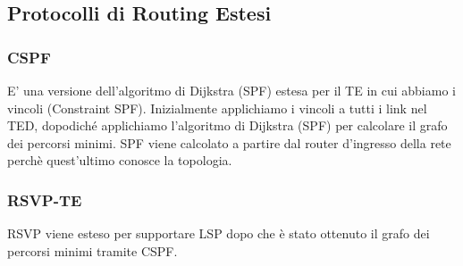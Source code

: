 \documentclass{article}
\begin{document}
\newpage
\subsection{Protocolli di Routing Estesi}
\subsubsection{CSPF}
E' una versione dell'algoritmo di Dijkstra (SPF) estesa per il TE in cui abbiamo i vincoli (Constraint SPF). Inizialmente applichiamo i vincoli a tutti i link nel TED, dopodiché applichiamo l'algoritmo di Dijkstra (SPF) per calcolare il grafo dei percorsi minimi. SPF viene calcolato a partire dal router d'ingresso della rete perchè quest'ultimo conosce la topologia.

\subsubsection{RSVP-TE}
RSVP viene esteso per supportare LSP dopo che è stato ottenuto il grafo dei percorsi minimi tramite CSPF.
\end{document}

